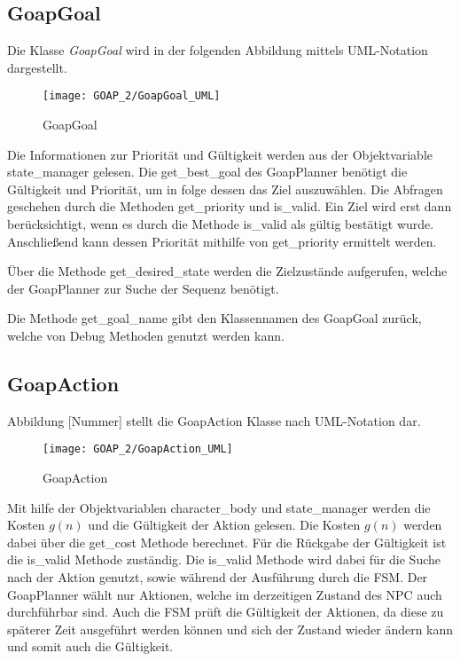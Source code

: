 \subsection{GoapGoal}

Die Klasse \textit{GoapGoal} wird in der folgenden Abbildung mittels UML-Notation dargestellt. 

\begin{figure}[h]
  \centering
  \texttt{[image: GOAP\_2/GoapGoal\_UML]}
	\captionsetup{justification=justified, format=plain}
  \caption{GoapGoal}
  \label{GoapGoal}
\end{figure}

Die Informationen zur Priorität und Gültigkeit werden aus der Objektvariable state\_manager gelesen. Die get\_best\_goal des GoapPlanner benötigt die Gültigkeit und Priorität, um in folge dessen das Ziel auszuwählen. Die Abfragen geschehen durch die Methoden get\_priority und is\_valid. Ein Ziel wird erst dann berücksichtigt, wenn es durch die Methode is\_valid als gültig bestätigt wurde. Anschließend kann dessen Priorität mithilfe von get\_priority ermittelt werden. 

Über die Methode get\_desired\_state werden die Zielzustände aufgerufen, welche der GoapPlanner zur Suche der Sequenz benötigt. 

Die Methode get\_goal\_name gibt den Klassennamen des GoapGoal zurück, welche von Debug Methoden genutzt werden kann.



\subsection{GoapAction}

Abbildung [Nummer] stellt die GoapAction Klasse nach UML-Notation dar.

\begin{figure}[h]
  \centering
  \texttt{[image: GOAP\_2/GoapAction\_UML]}
	\captionsetup{justification=justified, format=plain}
  \caption{GoapAction}
  \label{GoapAction}
\end{figure}

Mit hilfe der Objektvariablen character\_body und state\_manager werden die Kosten $g(n)$ und die Gültigkeit der Aktion gelesen. Die Kosten $g(n)$ werden dabei über die get\_cost Methode berechnet. Für die Rückgabe der Gültigkeit ist die is\_valid Methode zuständig. Die is\_valid Methode wird dabei für die Suche nach der Aktion genutzt, sowie während der Ausführung durch die FSM. Der GoapPlanner wählt nur Aktionen, welche im derzeitigen Zustand des NPC auch durchführbar sind. Auch die FSM prüft die Gültigkeit der Aktionen, da diese zu späterer Zeit ausgeführt werden können und sich der Zustand wieder ändern kann und somit auch die Gültigkeit.

